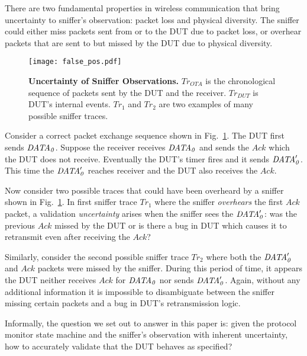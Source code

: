 There are two fundamental properties in wireless communication that bring uncertainty to
sniffer's observation: packet loss and physical diversity. The sniffer could
either miss packets sent from or to the DUT due to packet loss, or overhear packets
that are sent to but missed by the DUT due to physical diversity.

\begin{figure}[t!]
  \centering
  \texttt{[image: false\_pos.pdf]}
  \caption{\textbf{Uncertainty of Sniffer Observations.} $Tr_{OTA}$ is
    the chronological sequence of packets sent by the DUT and the receiver.
    $Tr_{DUT}$ is DUT's internal events. $Tr_1$ and $Tr_2$ are two examples of
    many possible sniffer traces.}
  \label{fig:sniffer_in_middle}
\end{figure}

Consider a correct packet exchange sequence shown in
Fig.~\ref{fig:sniffer_in_middle}. The DUT first sends $\it{DATA}_0$.  Suppose the
receiver receives $\it{DATA}_0$ and sends the $Ack$ which the DUT does not receive.
Eventually the DUT's timer fires and it sends $\it{DATA}'_0$.  This time the
$\it{DATA}'_0$ reaches receiver and the DUT also receives the $Ack$.

Now consider two possible traces that could have been overheard by a sniffer shown
in Fig.~\ref{fig:sniffer_in_middle}.
In first sniffer trace $Tr_1$ where the sniffer
\textit{overhears} the first $Ack$ packet, a validation \textit{uncertainty}
arises when the sniffer sees the $\it{DATA}'_0$: was the previous $Ack$ missed by the
DUT or is there a bug in DUT which causes it to retransmit even after receiving
the $Ack$?

Similarly, consider the second possible sniffer trace $Tr_2$
where both the $\it{DATA}'_0$ and $Ack$ packets were missed by the sniffer. During
this period of time, it appears the DUT neither receives $Ack$ for $\it{DATA}_0$ nor
sends $\it{DATA}'_0$. Again, without any additional information it is impossible to
disambiguate between the sniffer missing certain packets and a bug in DUT's
retransmission logic.

Informally, the question we set out to answer in this paper is: given the
protocol monitor state machine and the sniffer's observation with inherent
uncertainty, how to accurately validate that the DUT behaves as specified?
